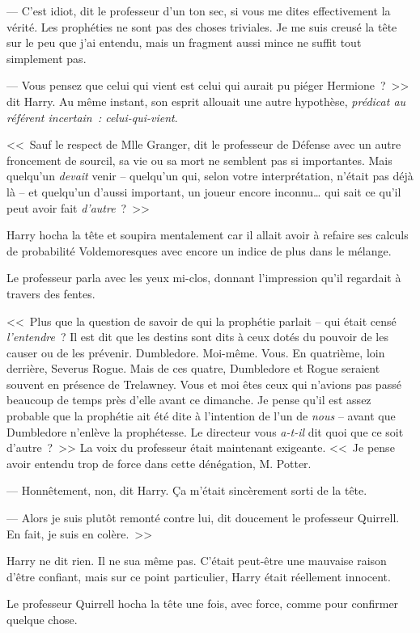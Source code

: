 --- C'est idiot, dit le professeur d'un ton sec, si vous me dites effectivement la vérité. Les prophéties ne sont pas des choses triviales. Je me suis creusé la tête sur le peu que j'ai entendu, mais un fragment aussi mince ne suffit tout simplement pas.

--- Vous pensez que celui qui vient est celui qui aurait pu piéger Hermione~?~>> dit Harry. Au même instant, son esprit allouait une autre hypothèse, \emph{prédicat au référent incertain~: celui-qui-vient}.

<<~Sauf le respect de Mlle Granger, dit le professeur de Défense avec un autre froncement de sourcil, sa vie ou sa mort ne semblent pas si importantes. Mais quelqu'un \emph{devait} venir -- quelqu'un qui, selon votre interprétation, n'était pas déjà là -- et quelqu'un d'aussi important, un joueur encore inconnu… qui sait ce qu'il peut avoir fait \emph{d'autre}~?~>>

Harry hocha la tête et soupira mentalement car il allait avoir à refaire ses calculs de probabilité Voldemoresques avec encore un indice de plus dans le mélange.

Le professeur parla avec les yeux mi-clos, donnant l'impression qu'il regardait à travers des fentes.

<<~Plus que la question de savoir de qui la prophétie parlait -- qui était censé \emph{l'entendre}~? Il est dit que les destins sont dits à ceux dotés du pouvoir de les causer ou de les prévenir. Dumbledore. Moi-même. Vous. En quatrième, loin derrière, Severus Rogue. Mais de ces quatre, Dumbledore et Rogue seraient souvent en présence de Trelawney. Vous et moi êtes ceux qui n'avions pas passé beaucoup de temps près d'elle avant ce dimanche. Je pense qu'il est assez probable que la prophétie ait été dite à l'intention de l'un de \emph{nous} -- avant que Dumbledore n'enlève la prophétesse. Le directeur vous \emph{a-t-il} dit quoi que ce soit d'autre~?~>> La voix du professeur était maintenant exigeante. <<~Je pense avoir entendu trop de force dans cette dénégation, M. Potter.

--- Honnêtement, non, dit Harry. Ça m'était sincèrement sorti de la tête.

--- Alors je suis plutôt remonté contre lui, dit doucement le professeur Quirrell. En fait, je suis en colère.~>>

Harry ne dit rien. Il ne sua même pas. C'était peut-être une mauvaise raison d'être confiant, mais sur ce point particulier, Harry était réellement innocent.

Le professeur Quirrell hocha la tête une fois, avec force, comme pour confirmer quelque chose.

